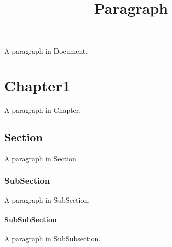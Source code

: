\documentclass[a4paper,11pt,oneside,openany,report]{jsbook}
\title{Paragraph}
\begin{document}
\maketitle
A paragraph in Document.

\chapter{Chapter1}
A paragraph in Chapter.

\section{Section}
A paragraph in Section.

\subsection{SubSection}
A paragraph in SubSection.

\subsubsection{SubSubSection}
A paragraph in SubSubsection.
\end{document}
